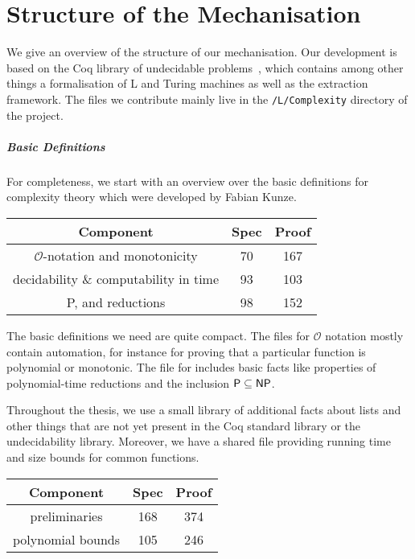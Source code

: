\chapter{Structure of the Mechanisation}\label{app:mecha}
We give an overview of the structure of our mechanisation. Our development is based on the Coq library of undecidable problems~\cite{coq_undec}, which contains among other things a formalisation of L and Turing machines as well as the extraction framework. 
The files we contribute mainly live in the \texttt{/L/Complexity} directory of the project.

\paragraph{Basic Definitions}
For completeness, we start with an overview over the basic definitions for complexity theory which were developed by Fabian Kunze. 
\begin{center}
  \begin{tabular}{ccc}
    Component & Spec & Proof \\
    \midrule
    $\mathcal{O}$-notation and monotonicity & 70 & 167  \\
    decidability \& computability in time & 93 & 103 \\ 
    \textsf{P}, \NP{} and reductions & 98 & 152
  \end{tabular}
\end{center}
The basic definitions we need are quite compact. The files for $\mathcal{O}$ notation mostly contain automation, for instance for proving that a particular function is polynomial or monotonic.
The file for \NP{} includes basic facts like properties of polynomial-time reductions and the inclusion $\textsf{P} \subseteq \textsf{NP}{}$.

Throughout the thesis, we use a small library of additional facts about lists and other things that are not yet present in the Coq standard library or the undecidability library. 
Moreover, we have a shared file providing running time and size bounds for common functions.
\begin{center}
  \begin{tabular}{ccc}
    Component & Spec & Proof \\
    \midrule
    preliminaries & 168 & 374 \\
    polynomial bounds & 105 & 246
  \end{tabular}
\end{center}

